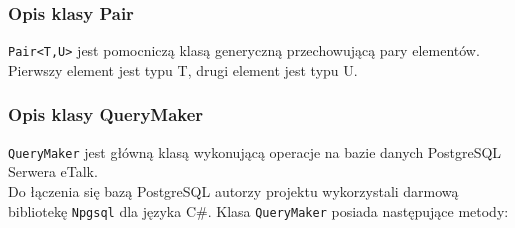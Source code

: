 \documentclass[a4paper,12pt]{article}
\begin{document}
\subsubsection[Opis klasy Pair]{Opis klasy Pair}
\texttt{Pair<T,U>} jest pomocniczą klasą generyczną przechowującą pary elementów.\\
Pierwszy element jest typu T, drugi element jest typu U.

\subsubsection[Opis klasy QueryMaker]{Opis klasy QueryMaker}
\texttt{QueryMaker} jest główną klasą wykonującą operacje na bazie danych PostgreSQL Serwera eTalk.\\
Do łączenia się bazą PostgreSQL autorzy projektu wykorzystali darmową bibliotekę \texttt{Npgsql} dla języka C\#.
Klasa \texttt{QueryMaker} posiada następujące metody:
\end{document}
